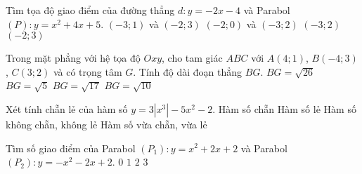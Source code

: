\begin{ex}%
	Tìm tọa độ giao điểm của đường thẳng $d:y=-2x-4$ và Parabol $(P):y=x^2+4x+5$.
	\choice
	{$(-3;1)$ và $(-2;3)$}
	{$(-2;0)$ và $(-3;2)$}
	{\True $(-3;2)$}
	{$(-2;3)$}
	\end{ex}
\begin{ex}%
	Trong mặt phẳng với hệ tọa độ $Oxy$, cho tam giác $ABC$ với $A(4;1)$, $B(-4;3)$, $C(3;2)$ và có trọng tâm $G$. Tính độ dài đoạn thẳng $BG$.
	\choice
	{\True $BG=\sqrt{26}$}
	{$BG=\sqrt{5}$}
	{$BG=\sqrt{17}$}
	{$BG=\sqrt{10}$}
\end{ex}
\begin{ex}%
	Xét tính chẵn lẻ của hàm số $y=3|x^3|-5x^2-2$.
	\choice
	{\True Hàm số chẵn}
	{Hàm số lẻ}
	{Hàm số không chẵn, không lẻ}
	{Hàm số vừa chẵn, vừa lẻ}
\end{ex}
\begin{ex}%
	Tìm số giao điểm của Parabol $(P_1):y=x^2+2x+2$ và Parabol $(P_2):y=-x^2-2x+2$.
	\choice
	{$0$}
	{$1$}
	{\True $2$}
	{$3$}
	\end{ex}
